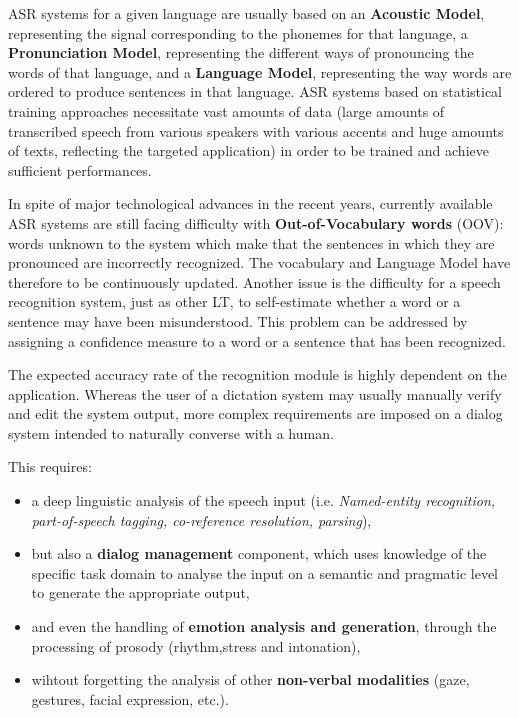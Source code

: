 \begin{multicols}{2}
ASR systems for a given language are usually based on an {\bf Acoustic
Model}, representing the signal corresponding to the phonemes for that
language, a {\bf Pronunciation Model}, representing the different ways of
pronouncing the words of that language, and a {\bf Language Model},
representing the way words are ordered to produce sentences in that
language. ASR systems based on statistical training approaches
necessitate vast amounts of data (large amounts of transcribed speech
from various speakers with various accents and huge amounts of texts,
reflecting the targeted application) in order to be trained and
achieve sufficient performances.

In spite of major technological advances in the recent years,
currently available ASR systems are still facing difficulty with
{\bf Out-of-Vocabulary words} (OOV): words unknown to the system which make
that the sentences in which they are pronounced are incorrectly
recognized. The vocabulary and Language Model have therefore to be
continuously updated. Another issue is the difficulty for a speech
recognition system, just as other LT, to self-estimate whether a word
or a sentence may have been misunderstood. This problem can be
addressed by assigning a confidence measure to a word or a sentence
that has been recognized.

The expected accuracy rate of the recognition module is highly
dependent on the application. Whereas the user of a dictation system
may usually manually verify and edit the system output, more complex
requirements are imposed on a dialog system intended to naturally
converse with a human. 

This requires:
\begin{itemize} 
\item a deep linguistic analysis of the speech input (i.e. {\em
  Named-entity recognition, part-of-speech tagging, co-reference
  resolution, parsing}),
\item but also a {\bf dialog management} component, which uses
  knowledge of the specific task domain to analyse the input on a
  semantic and pragmatic level to generate the appropriate output,
\item and even the handling of {\bf emotion analysis and generation},
  through the processing of prosody (rhythm,stress and intonation),
\item wihtout forgetting the analysis of other {\bf non-verbal
  modalities} (gaze, gestures, facial expression, etc.).
\end{itemize}


\end{multicols}
